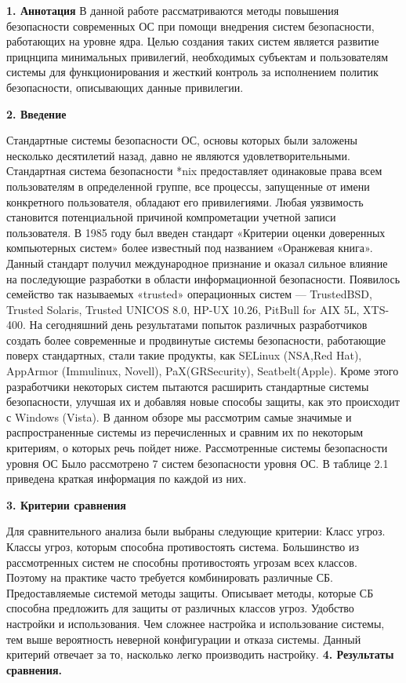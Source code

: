 {\bfseries 1. Аннотация} 
В данной работе рассматриваются методы повышения безопасности 
современных ОС при помощи внедрения систем безопасности,
работающих на уровне ядра. Целью создания таких систем является
развитие прицнципа минимальных привилегий, необходимых субъектам
и пользователям системы для функционирования и жесткий контроль 
за исполнением политик безопасности, описывающих данные привилегии.

\bigskip
{\bfseries 2. Введение} 

Стандартные системы безопасности ОС, основы которых были заложены несколько десятилетий назад, давно не являются удовлетворительными. Стандартная система безопасности *nix предоставляет одинаковые права всем пользователям в определенной группе, все процессы, запущенные от имени конкретного пользователя, обладают его привилегиями. Любая уязвимость становится потенциальной причиной компрометации учетной записи пользователя. В 1985 году был введен стандарт «Критерии оценки доверенных компьютерных систем» более известный под названием «Оранжевая книга». Данный стандарт получил международное признание и оказал сильное влияние на последующие разработки в области информационной безопасности. Появилось семейство так называемых «trusted» операционных систем — TrustedBSD, Trusted Solaris, Trusted UNICOS 8.0, HP-UX 10.26, PitBull for AIX 5L, XTS-400. На сегодняшний день результатами попыток различных разработчиков создать более современные и продвинутые системы безопасности, работающие поверх стандартных, стали такие продукты, как SELinux (NSA,Red Hat), AppArmor (Immulinux, Novell), PaX(GRSecurity), Seatbelt(Apple). Кроме этого разработчики некоторых систем пытаются расширить стандартные системы безопасности, улучшая их и добавляя новые способы защиты, как это происходит с Windows (Vista). В данном обзоре мы рассмотрим самые значимые и распространенные системы из перечисленных и сравним их по некоторым критериям, о которых речь пойдет ниже.
Рассмотренные системы безопасности уровня ОС 
Было рассмотрено 7 систем безопасности уровня ОС. В таблице 2.1 приведена краткая информация по каждой из них. 

\bigskip 
{\bfseries 3. Критерии сравнения} 

Для сравнительного анализа были выбраны следующие критерии: 
Класс угроз. Классы угроз, которым способна противостоять система. Большинство из рассмотренных систем не способны противостоять угрозам всех классов. Поэтому на практике часто требуется комбинировать различные СБ. 
Предоставляемые системой методы защиты. Описывает методы, которые СБ способна предложить для защиты от различных классов угроз. 
Удобство настройки и использования. Чем сложнее настройка и использование системы, тем выше вероятность неверной конфигурации и отказа системы. Данный критерий отвечает за то, насколько легко производить настройку. 
\bigskip
{\bfseries 4. Результаты сравнения.} 

